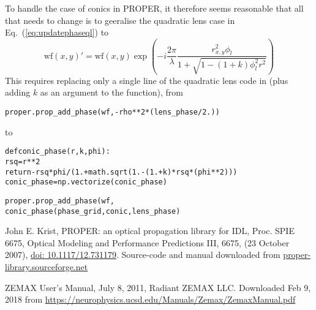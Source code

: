 \documentclass[12pt,a4paper]{article}
\begin{document}
To handle the case of conics in PROPER, it therefore seems reasonable that all that needs to change is to geeralise the quadratic lens case in Eq.~(\ref{eq:updatephaseql}) to
\begin{equation} \label{eq:updatephaseconic}
\mathrm{wf}(x,y)' = \mathrm{wf}(x,y) \exp\left(-i\frac{2\pi}{\lambda}  \frac{r_{x,y}^2\phi_l}{1 + \sqrt{1 - (1+k)\phi_l^2r^2}}\right)
\end{equation}
This requires replacing only a single line of the quadratic lens code in  (plus adding $k$ as an argument to the function), from
\begin{framed}
\begin{alltt}
proper.prop_add_phase(wf, -rho**2 * (lens_phase/2.))
\end{alltt}
\end{framed}
to
\begin{framed}
\begin{alltt}
def conic_phase(r,k,phi):
  rsq = r**2
  return -rsq*phi/(1. + math.sqrt(1. - (1. + k)*rsq*(phi**2)))
conic_phase = np.vectorize(conic_phase)

proper.prop_add_phase(wf, 
              conic_phase(phase_grid, conic, lens_phase)
\end{alltt}
\end{framed}

\begin{thebibliography}{99} 
 John E. Krist, PROPER: an optical propagation library for IDL, Proc. SPIE 6675, Optical Modeling and Performance Predictions III, 6675, (23 October 2007), \href{http://dx.doi.org/10.1117/12.731179}{doi: 10.1117/12.731179}. Source-code and manual downloaded from \url{proper-library.sourceforge.net}
 
 ZEMAX User's Manual, July 8, 2011, Radiant ZEMAX LLC.
Downloaded Feb 9, 2018 from \url{https://neurophysics.ucsd.edu/Manuals/Zemax/ZemaxManual.pdf}
 
\end{thebibliography}
\end{document}
